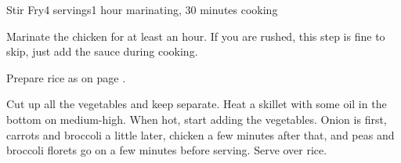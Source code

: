 \documentclass[../Cookbook.tex]{subfiles}
\begin{document}
\begin{recipe}{Stir Fry}{4 servings}{1 hour marinating, 30 minutes cooking}

Marinate the chicken for at least an hour. If you are rushed, this step is fine to skip, just add the sauce during cooking.

Prepare rice as on page \pageref{Rice}.

Cut up all the vegetables and keep separate. Heat a skillet with some oil in the bottom on medium-high. When hot, start adding the vegetables. Onion is first, carrots and broccoli a little later, chicken a few minutes after that, and peas and broccoli florets go on a few minutes before serving.
Serve over rice.

\end{recipe}
\end{document}
